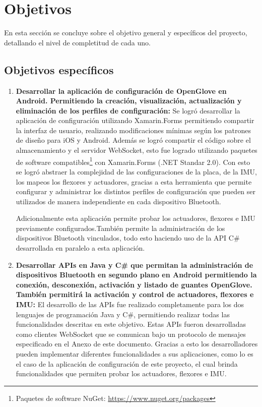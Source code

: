 \section{Objetivos}
En esta sección se concluye sobre el objetivo general y específicos del proyecto, detallando el nivel de completitud de cada uno.

\subsection{Objetivos específicos}
\begin{enumerate}

\item \textbf{Desarrollar la aplicación de configuración de OpenGlove en Android. Permitiendo la creación, visualización, actualización y eliminación de los perfiles de configuración:}
Se logró desarrollar la aplicación de configuración utilizando Xamarin.Forms permitiendo compartir la interfaz de usuario, realizando modificaciones mínimas según los patrones de diseño para iOS y Android. Además se logró compartir el código sobre el almacenamiento y el servidor WebSocket,  esto fue logrado utilizando paquetes de software compatibles\footnote{Paquetes de software NuGet: \url{https://www.nuget.org/packages}} con Xamarin.Forms (.NET Standar 2.0). Con esto se logró abstraer la complejidad de las configuraciones de la placa, de la IMU, los mapeos los flexores y actuadores, gracias a esta herramienta que permite configurar y administrar los distintos perfiles de configuración que pueden ser utilizados de manera independiente en cada dispositivo Bluetooth.

Adicionalmente esta aplicación permite probar los actuadores, flexores e IMU previamente configurados.También permite la administración de los dispositivos Bluetooth vinculados, todo esto haciendo uso de la API C\# desarrollada en paralelo a esta aplicación.

\item \textbf{Desarrollar APIs en Java y C\# que permitan la administración de dispositivos Bluetooth en segundo plano en Android permitiendo la conexión, desconexión, activación y listado de guantes OpenGlove.  También permitirá la activación y control de actuadores, flexores e IMU: } 
El desarrollo de las APIs fue realizado completamente para los dos lenguajes de programación Java y C\#, permitiendo realizar todas las funcionalidades descritas en este objetivo. Estas APIs fueron desarrolladas como clientes WebSocket que se comunican bajo un protocolo de mensajes especificado en el Anexo de este documento. Gracias a esto los desarrolladores pueden implementar diferentes funcionalidades a sus aplicaciones, como lo es el caso de la aplicación de configuración de este proyecto, el cual brinda funcionalidades que permiten probar los actuadores, flexores e IMU.


\end{enumerate}
